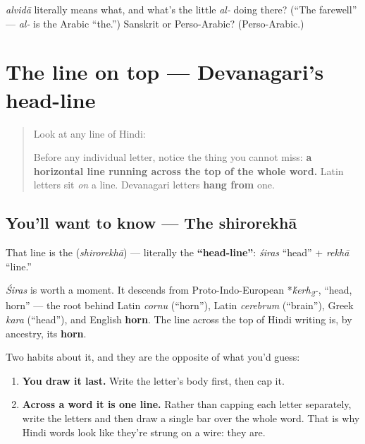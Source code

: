 \begin{tcolorbox}[breakable,colback=teal!4,colframe=teal!35!black,title={Before you move on}]
\emph{alvidā} literally means what, and what's the little \emph{al-} doing there? (\textquotedblleft{}The farewell\textquotedblright{} — \emph{al-} is the Arabic \textquotedblleft{}the.\textquotedblright{}) Sanskrit or Perso-Arabic? (Perso-Arabic.)
\end{tcolorbox}
\section[\texorpdfstring{\hi{शिरोरेखा} (shirorekhā)}{शिरोरेखा (shirorekhā)}]{The line on top — Devanagari's head-line}

\label{lesson:HI-W01-shirorekha-na-ma}



\begin{quote}
Look at any line of Hindi:

\begin{quote}
\end{quote}

Before any individual letter, notice the thing you cannot miss: \textbf{a horizontal line running across the top of the whole word.} Latin letters sit \emph{on} a line. Devanagari letters \textbf{hang from} one.
\end{quote}

\subsection*{You'll want to know — The shirorekhā}
That line is the \textbf{} (\emph{shirorekhā}) — literally the \textbf{\textquotedblleft{}head-line\textquotedblright{}}: \emph{śiras} \textquotedblleft{}head\textquotedblright{} + \emph{rekhā} \textquotedblleft{}line.\textquotedblright{}

\emph{Śiras} is worth a moment. It descends from Proto-Indo-European *\emph{\'{k}erh\textsubscript{2}-}, \textquotedblleft{}head, horn\textquotedblright{} — the root behind Latin \emph{cornu} (\textquotedblleft{}horn\textquotedblright{}), Latin \emph{cerebrum} (\textquotedblleft{}brain\textquotedblright{}), Greek \emph{kara} (\textquotedblleft{}head\textquotedblright{}), and English \textbf{horn}. The line across the top of Hindi writing is, by ancestry, its \textbf{horn}.

Two habits about it, and they are the opposite of what you'd guess:

\begin{enumerate}
\raggedright
  \item \textbf{You draw it last.} Write the letter's body first, then cap it.
  \item \textbf{Across a word it is one line.} Rather than capping each letter separately, write the letters and then draw a single bar over the whole word. That is why Hindi words look like they're strung on a wire: they are.
\end{enumerate}

